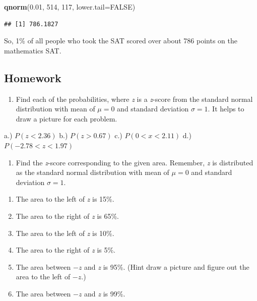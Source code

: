 \documentclass[
]{book}
\newenvironment{Shaded}{\begin{snugshade}}{\end{snugshade}}
\newcommand{\DataTypeTok}[1]{\textcolor[rgb]{0.13,0.29,0.53}{#1}}
\newcommand{\DecValTok}[1]{\textcolor[rgb]{0.00,0.00,0.81}{#1}}
\newcommand{\FloatTok}[1]{\textcolor[rgb]{0.00,0.00,0.81}{#1}}
\newcommand{\KeywordTok}[1]{\textcolor[rgb]{0.13,0.29,0.53}{\textbf{#1}}}
\newcommand{\NormalTok}[1]{#1}
\newcommand{\OtherTok}[1]{\textcolor[rgb]{0.56,0.35,0.01}{#1}}
\providecommand{\tightlist}{%
  \setlength{\itemsep}{0pt}\setlength{\parskip}{0pt}}
\begin{document}
\begin{Shaded}
\begin{Highlighting}[]
\KeywordTok{qnorm}\NormalTok{(}\FloatTok{0.01}\NormalTok{, }\DecValTok{514}\NormalTok{, }\DecValTok{117}\NormalTok{, }\DataTypeTok{lower.tail=}\OtherTok{FALSE}\NormalTok{)}
\end{Highlighting}
\end{Shaded}

\begin{verbatim}
## [1] 786.1827
\end{verbatim}

So, 1\% of all people who took the SAT scored over about 786 points on the mathematics SAT.

\hypertarget{homework-13}{%
\subsection{Homework}\label{homework-13}}

\begin{enumerate}
\def\labelenumi{\arabic{enumi}.}
\tightlist
\item
  Find each of the probabilities, where \emph{z} is a \emph{z}-score from the standard normal distribution with mean of \(\mu=0\) and standard deviation \(\sigma=1\). It helps to draw a picture for each problem.
\end{enumerate}

a.) \(P(z<2.36)\)
b.) \(P(z>0.67)\)
c.) \(P(0<x<2.11)\)
d.) \(P(-2.78<z<1.97)\)

\begin{enumerate}
\def\labelenumi{\arabic{enumi}.}
\setcounter{enumi}{1}
\tightlist
\item
  Find the \emph{z}-score corresponding to the given area. Remember, \emph{z} is distributed as the standard normal distribution with mean of \(\mu=0\) and standard deviation \(\sigma=1\).
\end{enumerate}

\begin{enumerate}
\def\labelenumi{\alph{enumi}.}
\tightlist
\item
  The area to the left of \emph{z} is 15\%.
\item
  The area to the right of \emph{z} is 65\%.
\item
  The area to the left of \emph{z} is 10\%.
\item
  The area to the right of \emph{z} is 5\%.
\item
  The area between \(-z\) and \emph{z} is 95\%. (Hint draw a picture and figure out the area to the left of \(-z\).)
\item
  The area between \(-z\) and \emph{z} is 99\%.
\end{enumerate}
\end{document}
